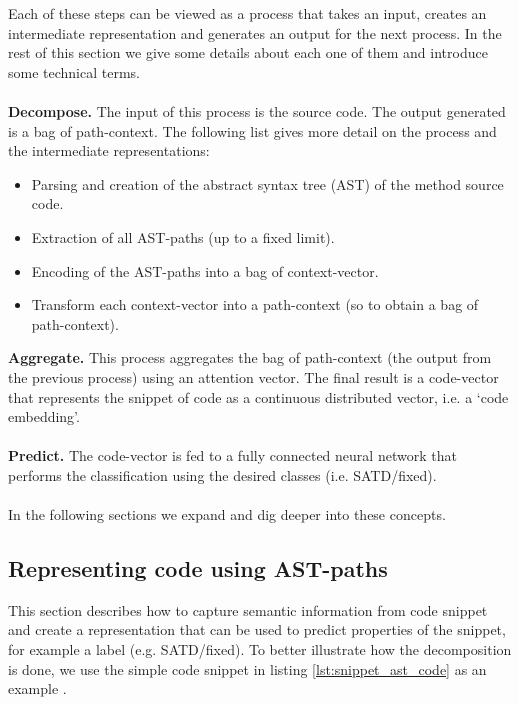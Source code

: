 \noindent Each of these steps can be viewed as a process that takes an input, creates an intermediate representation and generates an output for the next process.
In the rest of this section we give some details about each one of them and introduce some technical terms. 
\\
\\
\noindent \textbf{Decompose.} The input of this process is the source code. The output generated is a bag of path-context. The following list gives more detail on the process and the intermediate representations:

\begin{itemize}
    \item Parsing and creation of the abstract syntax tree (AST) of the method source code. 
    \item Extraction of all AST-paths (up to a fixed limit).
    \item Encoding of the AST-paths into a bag of context-vector.
    \item Transform each context-vector into a path-context (so to obtain a bag of path-context).
\end{itemize}

\noindent \textbf{Aggregate.} This process aggregates the bag of path-context (the output from the previous process) using an attention vector. The final result is a code-vector that represents the snippet of code as a continuous distributed vector, i.e. a `code embedding'.
\\
\\
\noindent \textbf{Predict.} The code-vector is fed to a fully connected neural network that performs the classification using the desired classes (i.e. SATD/fixed).
\\
\\
\noindent In the following sections we expand and dig deeper into these concepts.


\subsection{Representing code using AST-paths} \label{sec:code2vec_ast_paths}
This section describes how to capture semantic information from code snippet and create a representation that can be used to predict properties of the snippet, for example a label (e.g. SATD/fixed).
To better illustrate how the decomposition is done, we use the simple code snippet in listing \ref{lst:snippet_ast_code} as an example .

